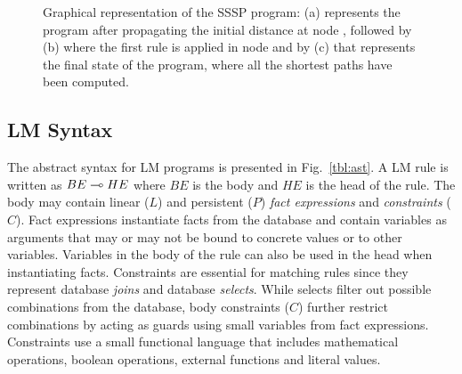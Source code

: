 \begin{figure}[ht]
\begin{center}
  \hspace{0.01cm}
  \hspace{0.01cm}
\end{center}
\caption{Graphical representation of the SSSP program: (a) represents the
   program after propagating the initial distance at node , followed by
   (b) where the first rule is applied in node  and by (c) that
   represents the final state of the program, where all the shortest paths
   have been computed.}
\label{fig:shortest_path_program}
\end{figure}


\subsection{LM Syntax}

The abstract syntax for LM programs is presented in Fig.~\ref{tbl:ast}.  A LM
rule is written as $BE \multimap HE$ where $BE$ is the body and $HE$ is the head of
the rule. The body may contain linear ($L$) and persistent ($P$) \emph{fact
   expressions} and \emph{constraints} ($C$). Fact expressions instantiate facts
from the database and contain variables as arguments that may or may not be
bound to concrete values or to other variables.  Variables in the body of the
rule can also be used in the head when instantiating facts.  Constraints are
essential for matching rules since they represent database \emph{joins} and
database \emph{selects}.  While selects filter out possible combinations from
the database, body constraints ($C$) further restrict combinations by acting as
guards using small variables from fact expressions.  Constraints use a small
functional language that includes mathematical operations, boolean operations,
external functions and literal values.

